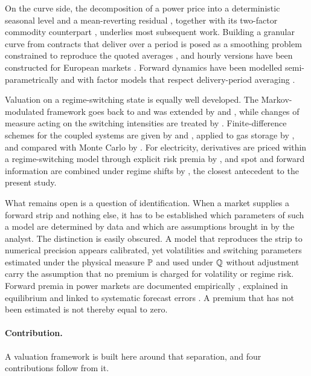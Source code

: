 On the curve side, the decomposition of a power price into a deterministic
seasonal level and a mean-reverting residual \citep{LuciaSchwartz2002}, together
with its two-factor commodity counterpart \citep{SchwartzSmith2000}, underlies
most subsequent work. Building a granular curve from contracts that deliver
over a period is posed as a smoothing problem constrained to reproduce the
quoted averages \citep{FletenLemming2003,BenthKoekebakkerOllmar2007}, and
hourly versions have been constructed for European markets
\citep{Caldana2017,Kiesel2019}. Forward dynamics have been modelled
semi-parametrically \citep{Borak2008} and with factor models that respect
delivery-period averaging \citep{KieselSchindlmayrBorger2009,BenthBenthKoekebakker2008}.

Valuation on a regime-switching state is equally well developed. The
Markov-modulated framework goes back to \citet{Naik1993} and was extended by
\citet{BuffingtonElliott2002} and \citet{JobertRogers2006}, while changes of
measure acting on the switching intensities are treated by
\citet{ElliottChanSiu2005}. Finite-difference schemes for the coupled systems
are given by \citet{BoyleDraviam2007} and \citet{Huang2011}, applied to gas
storage by \citet{ChenForsyth2010}, and compared with Monte Carlo by
\citet{Zeng2017}. For electricity, derivatives are priced within a
regime-switching model through explicit risk premia by \citet{Janczura2014},
and spot and forward information are combined under regime shifts by
\citet{Paraschiv2015}, the closest antecedent to the present study.

What remains open is a question of identification. When a market supplies a
forward strip and nothing else, it has to be established which parameters of
such a model are determined by data and which are assumptions brought in by
the analyst. The distinction is easily obscured. A model that reproduces the
strip to numerical precision appears calibrated, yet volatilities and
switching parameters estimated under the physical measure $\mathbb{P}$ and used under
$\mathbb{Q}$ without adjustment carry the assumption that no premium is charged for
volatility or regime risk. Forward premia in power markets are documented
empirically \citep{LongstaffWang2004,Viehmann2011,WeronZator2014,Algieri2021},
explained in equilibrium \citep{BessembinderLemmon2002,BenthCarteaKiesel2008}
and linked to systematic forecast errors \citep{Redl2009}. A premium that has
not been estimated is not thereby equal to zero.

\paragraph{Contribution.}
A valuation framework is built here around that separation, and four
contributions follow from it.

